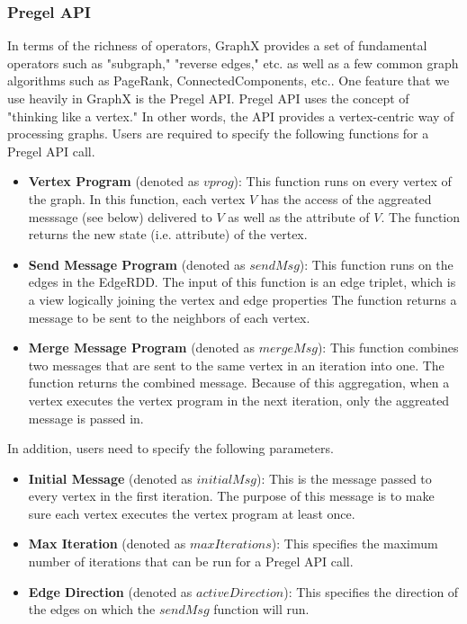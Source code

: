 \subsubsection{Pregel API}
%
In terms of the richness of operators, GraphX provides a set of fundamental operators such as "subgraph," "reverse edges," etc. as well as a few common graph algorithms such as PageRank, ConnectedComponents, etc..
%
One feature that we use heavily in GraphX is the Pregel API.
%
Pregel API uses the concept of "thinking like a vertex."
%
In other words, the API provides a vertex-centric way of processing graphs.
%
Users are required to specify the following functions for a Pregel API call.
%
\begin{itemize}
%
\item \textbf{Vertex Program} (denoted as $vprog$): 
%
This function runs on every vertex of the graph.
%
In this function, each vertex $V$ has the access of the aggreated messsage (see below) delivered to $V$ as well as the attribute of $V$.
%
The function returns the new state (i.e. attribute) of the vertex.
%
\item \textbf{Send Message Program} (denoted as $sendMsg$):
%
This function runs on the edges in the EdgeRDD. 
%
The input of this function is an edge triplet, which is a view logically joining the vertex and edge properties
%
The function returns a message to be sent to the neighbors of each vertex.
%
\item \textbf{Merge Message Program} (denoted as $mergeMsg$):
%
This function combines two messages that are sent to the same vertex in an iteration into one.
%
The function returns the combined message.
%
Because of this aggregation, when a vertex executes the vertex program in the next iteration, only the aggreated message is passed in.
%
\end{itemize}
%
In addition, users need to specify the following parameters.
%
\begin{itemize}
%
\item \textbf{Initial Message} (denoted as $initialMsg$):
%
This is the message passed to every vertex in the first iteration.
%
The purpose of this message is to make sure each vertex executes the vertex program at least once.
%
\item \textbf{Max Iteration} (denoted as $maxIterations$):
%
This specifies the maximum number of iterations that can be run for a Pregel API call.
%
\item \textbf{Edge Direction} (denoted as $activeDirection$):
%
This specifies the direction of the edges on which the $sendMsg$ function will run.
%
\end{itemize}
